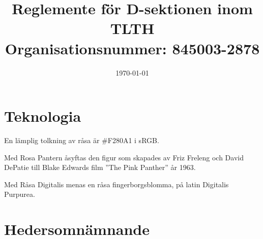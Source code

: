\documentclass[pdfbookmarks,a4paper,11pt]{article}
\title{Reglemente för D-sektionen inom TLTH\\ Organisationsnummer: 845003-2878}
\date{\today}
\newlength{\itemcollength}
\newenvironment{reglemlista}{%
  \begin{list}{}{%
      \setlength{\labelwidth}{\itemcollength}%
      \setlength{\leftmargin}{\labelwidth + \labelsep}%
      \renewcommand{\makelabel}[1]{%
        \raisebox{0pt}[1ex][0pt]{%
          \makebox[\labelwidth][l]{%
            \parbox[t]{\itemcollength}{%
              \raggedright\hspace{0pt}##1}}}\hfill}%
      }}{%
  \end{list}}
\begin{document}
\maketitle

\section{Teknologia}

\begin{reglemlista}

	\item[Råsa]
	En lämplig tolkning av råsa är \#F280A1 i sRGB.

	\item[Rosa Pantern]
	Med Rosa Pantern åsyftas den figur som skapades av Friz Freleng och David
	DePatie till Blake Edwards film ''The Pink Panther'' år 1963.

	\item[Råsa Digitalis]
	Med Råsa Digitalis menas en råsa fingerborgsblomma, på latin Digitalis Purpurea.

\end{reglemlista}


\section{Hedersomnämnande}
\end{document}
